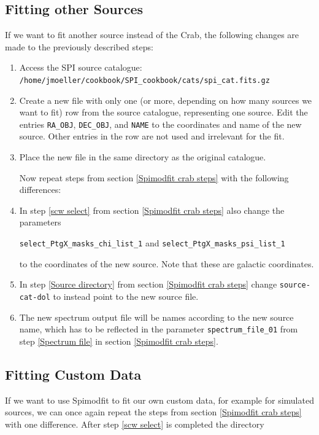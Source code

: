 \documentclass{article}
\begin{document}
\subsection{Fitting other Sources}
If we want to fit another source instead of the Crab, the following changes are made to the previously described steps:

\begin{enumerate}
    \item Access the SPI source catalogue: \verb|/home/jmoeller/cookbook/SPI_cookbook/cats/spi_cat.fits.gz|
    \item Create a new file with only one (or more, depending on how many sources we want to fit) row from the source catalogue, representing one source. Edit the entries \verb|RA_OBJ|, \verb|DEC_OBJ|, and \verb|NAME| to the coordinates and name of the new source. Other entries in the row are not used and irrelevant for the fit.
    \item Place the new file in the same directory as the original catalogue.
    
    Now repeat steps from section \ref{Spimodfit crab steps} with the following differences:
    \item In step \ref{scw select} from section \ref{Spimodfit crab steps} also change the parameters 
    
    \verb|select_PtgX_masks_chi_list_1| and \verb|select_PtgX_masks_psi_list_1| 
    
    to the coordinates of the new source. Note that these are galactic coordinates.
    \item In step \ref{Source directory} from section \ref{Spimodfit crab steps} change \verb|source-cat-dol| to instead point to the new source file.
    \item The new spectrum output file will be names according to the new source name, which has to be reflected in the parameter \verb|spectrum_file_01| from step \ref{Spectrum file} in section \ref{Spimodfit crab steps}.
\end{enumerate}


\subsection{Fitting Custom Data}
If we want to use Spimodfit to fit our own custom data, for example for simulated sources, we can once again repeat the steps from section \ref{Spimodfit crab steps} with one difference. After step \ref{scw select} is completed the directory
\end{document}
